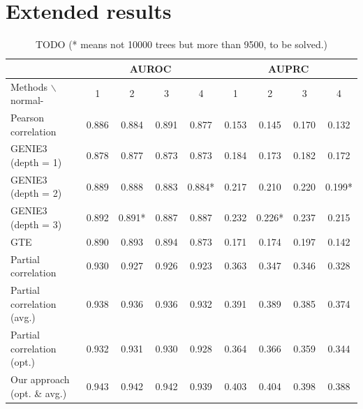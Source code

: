 \documentclass[wcp]{jmlr}
\begin{document}


\section{Extended results}

\begin{table}
\small
\centering
\begin{tabular}{@{}l *{8}{c}@{}}
  & \multicolumn{4}{c}{AUROC} & \multicolumn{4}{c}{AUPRC} \\
\hline \hline
Methods $\backslash$ normal- & 1 & 2 & 3 & 4 & 1 & 2 & 3 & 4 \\
\hline \hline
Pearson correlation    & 0.886 & 0.884 & 0.891 & 0.877 & 0.153 & 0.145 & 0.170 & 0.132 \\
GENIE3 (depth = 1)     & 0.878 & 0.877 & 0.873 & 0.873 & 0.184 & 0.173 & 0.182& 0.172\\
GENIE3 (depth = 2)     & 0.889 & 0.888 & 0.883 & 0.884* & 0.217 & 0.210 & 0.220 & 0.199* \\
GENIE3 (depth = 3)     & 0.892 & 0.891* & 0.887 & 0.887 & 0.232 & 0.226* & 0.237 & 0.215\\
GTE                    & 0.890 & 0.893 & 0.894 & 0.873 & 0.171 & 0.174 & 0.197 & 0.142 \\
Partial correlation    & 0.930 &  0.927 &  0.926 &  0.923& 0.363  & 0.347 &  0.346 & 0.328 \\
Partial correlation (avg.) & 0.938 & 0.936 & 0.936 & 0.932& 0.391 & 0.389 & 0.385 & 0.374\\
Partial correlation (opt.) & 0.932 & 0.931 & 0.930 & 0.928 & 0.364 & 0.366 & 0.359 & 0.344 \\
Our approach (opt. \& avg.)    & 0.943 & 0.942 & 0.942 & 0.939 & 0.403 & 0.404 & 0.398 & 0.388 \\
\end{tabular}
\caption{TODO (* means not 10000 trees but more than 9500, to be solved.) }
\label{tab:tab1}
\end{table}
\end{document}
